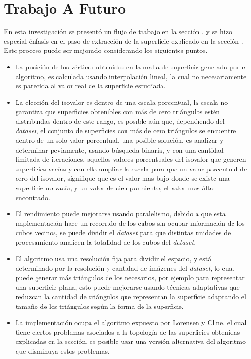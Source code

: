 \chapter{Trabajo A Futuro}
\label{ch:trabajoafuturo}

En esta investigación se presentó un flujo de trabajo en la sección \label{ch:propuesta:sec:flujoDeTrabajo}, y se hizo especial énfasis en el paso de extracción de la superficie explicado en la sección \label{ch:propuesta:sec:extraccionDeLaSuperficie}. Este proceso puede ser mejorado considerando los siguientes puntos.

\begin{itemize}
	\item La posición de los vértices obtenidos en la malla de superficie generada por el algoritmo, es calculada usando interpolación lineal, la cual no necesariamente es parecida al valor real de la superficie estudiada.

	\item La elección del isovalor es dentro de una escala porcentual, la escala no garantiza que superficies obtenibles con más de cero triángulos estén distribuidas dentro de este rango, es posible aún que, dependiendo del \emph{dataset}, el conjunto de superficies con más de cero triángulos se encuentre dentro de un solo valor porcentual, una posible solución, es analizar y determinar peviamente, usando búsqueda binaria, y con una cantidad limitada de iteraciones, aquellos valores porcentuales del isovalor que generen superficies vacías y con ello ampliar la escala para que un valor porcentual de cero del isovalor, signifique que es el valor mas bajo donde se existe una superficie no vacía, y un valor de cien por ciento, el valor mas álto encontrado.

	\item El rendimiento puede mejorarse usando paralelismo, debido a que esta implementación hace un recorrido de los cubos sin ocupar información de los cubos vecinos, se puede dividir el \emph{dataset} para que distintas unidades de procesamiento analicen la totalidad de los cubos del \emph{dataset}.

	\item El algoritmo usa una resolución fija para dividir el espacio, y está determinado por la resolución y cantidad de imágenes del \emph{dataset}, lo cual puede generar más triángulos de los necesarios, por ejemplo para representar una superficie plana, esto puede mejorarse usando técnicas adaptativas\cite{Shu95adaptivemarching} que reduzcan la cantidad de triángulos que representan la superficie adaptando el tamaño de los triángulos según la forma de la superficie.

	\item La implementación ocupa el algoritmo expuesto por Lorensen y Cline\cite{Lorensen87marchingcubes}, el cual tiene ciertos problemas asociados a la topología de las superficies obtenidas explicadas en la sección\label{subsec:marchingCubes:consecuencias}, es posible usar una versión alternativa del algoritmo que disminuya estos problemas\cite{Bloomenthal88polygonizationof}\cite{Chernyaev95marchingcubes}\cite{BAPayne90surfacemapping}\cite{Shu95adaptivemarching}.
\end{itemize}